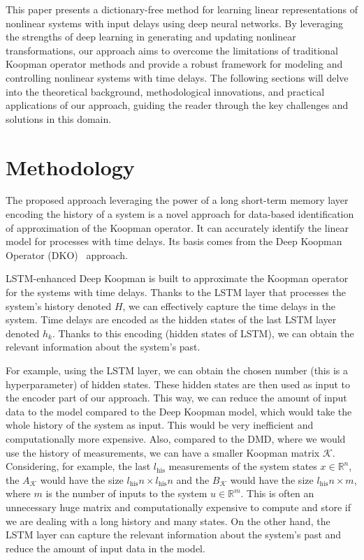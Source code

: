 \documentclass[conference]{IEEEtran}
\newcommand{\ui}[2]{#1_{\text{#2}}}
\begin{document}
This paper presents a dictionary-free method for learning linear representations of nonlinear systems with input delays using deep neural networks. By leveraging the strengths of deep learning in generating and updating nonlinear transformations, our approach aims to overcome the limitations of traditional Koopman operator methods and provide a robust framework for modeling and controlling nonlinear systems with time delays. The following sections will delve into the theoretical background, methodological innovations, and practical applications of our approach, guiding the reader through the key challenges and solutions in this domain.

\section{Methodology}

The proposed approach leveraging the power of a long short-term memory layer encoding the history of a system is a novel approach for data-based identification of approximation of the Koopman operator. It can accurately identify the linear model for processes with time delays. Its basis comes from the Deep Koopman Operator (DKO)~\cite{lusch2018deep} approach.

LSTM-enhanced Deep Koopman is built to approximate the Koopman operator for the systems with time delays. Thanks to the LSTM layer that processes the system's history denoted \(H\), we can effectively capture the time delays in the system. Time delays are encoded as the hidden states of the last LSTM layer denoted \(h_k\). Thanks to this encoding (hidden states of LSTM), we can obtain the relevant information about the system's past.

For example, using the LSTM layer, we can obtain the chosen number (this is a hyperparameter) of hidden states. These hidden states are then used as input to the encoder part of our approach. This way, we can reduce the amount of input data to the model compared to the Deep Koopman model, which would take the whole history of the system as input. This would be very inefficient and computationally more expensive.
Also, compared to the DMD, where we would use the history of measurements, we can have a smaller Koopman matrix \(\mathcal{K}\). Considering, for example, the last \(\ui{l}{his}\) measurements of the system states \(x \in \mathbb{R}^n\), the \(A_\mathcal{K}\) would have the size \(\ui{l}{his}n \times \ui{l}{his}n\) and the \(B_\mathcal{K}\) would have the size \(\ui{l}{his}n \times m\),  where \(m\) is the number of inputs to the system \(u \in \mathbb{R}^m\). This is often an unnecessary huge matrix and computationally expensive to compute and store if we are dealing with a long history and many states. On the other hand, the LSTM layer can capture the relevant information about the system's past and reduce the amount of input data in the model.
\end{document}
